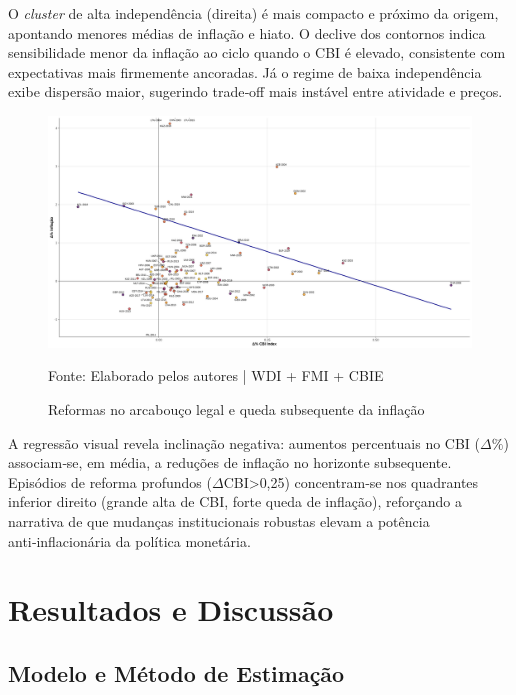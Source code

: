 \documentclass[a4paper,12pt]{article}
\begin{document}
O \textit{cluster} de alta independência (direita) é mais compacto e próximo da origem, apontando menores médias de inflação e hiato.  
O declive dos contornos indica sensibilidade menor da inflação ao ciclo quando o CBI é elevado, consistente com expectativas mais firmemente ancoradas.  
Já o regime de baixa independência exibe dispersão maior, sugerindo trade‑off mais instável entre atividade e preços.


\begin{figure}[H]
    \centering
    \caption{Reformas no arcabouço legal e queda subsequente da inflação}
    \includegraphics[width=.85\linewidth]{Imagens/paperi13.png}
    \label{fig:reforms}

    \footnotesize{Fonte: Elaborado pelos autores | WDI + FMI + CBIE}
\end{figure}

A regressão visual revela inclinação negativa: aumentos percentuais no CBI (\(\Delta\%\)) associam‑se, em média, a reduções de inflação no horizonte subsequente.  
Episódios de reforma profundos (\(\Delta\)CBI{>}0,25) concentram‑se nos quadrantes inferior direito (grande alta de CBI, forte queda de inflação), reforçando a narrativa de que mudanças institucionais robustas elevam a potência anti‑inflacionária da política monetária.


\section*{\textbf{Resultados e Discussão}}

\subsection*{\textbf{Modelo e Método de Estimação}}
\end{document}
